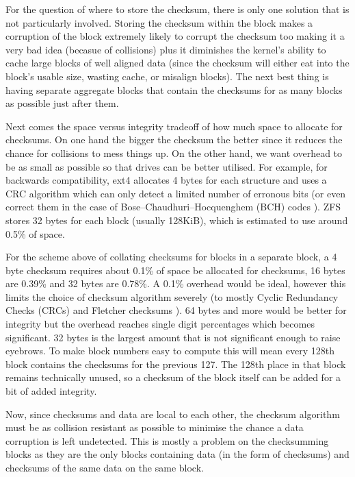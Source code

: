         For the question of where to store the checksum, there is only one
        solution that is not particularly involved. Storing the checksum within
        the block makes a corruption of the block extremely likely to corrupt
        the checksum too making it a very bad idea (becasue of collisions) plus
        it diminishes the kernel's ability to cache large blocks of well
        aligned data (since the checksum will either eat into the block's
        usable size, wasting cache, or misalign blocks). The next best thing is
        having separate aggregate blocks that contain the checksums for as many
        blocks as possible just after them.

        Next comes the space versus integrity tradeoff of how much space to
        allocate for checksums. On one hand the bigger the checksum the better
        since it reduces the chance for collisions to mess things up. On the
        other hand, we want overhead to be as small as possible so that drives
        can be better utilised. For example, for backwards compatibility, ext4
        allocates 4 bytes for each structure \cite{ext4_docs} and uses a CRC
        algorithm which can only detect a limited number of erronous bits (or
        even correct them in the case of Bose–Chaudhuri–Hocquenghem (BCH) codes
        \cite{flash_error_manual}). ZFS stores 32 bytes \cite{ZFS_docs} for
        each block (usually 128KiB), which is estimated to use around 0.5\%
        \cite{ZFS_overhead} of space.

        For the scheme above of collating checksums for blocks in a separate
        block, a 4 byte checksum requires about 0.1\% of space be allocated for
        checksums, 16 bytes are 0.39\% and 32 bytes are 0.78\%. A 0.1\%
        overhead would be ideal, however this limits the choice of checksum
        algorithm severely (to mostly Cyclic Redundancy Checks (CRCs) and
        Fletcher checksums \cite{embedded_checksums}). 64 bytes and more would
        be better for integrity but the overhead reaches single digit
        percentages which becomes significant. 32 bytes is the largest amount
        that is not significant enough to raise eyebrows. To make block numbers
        easy to compute this will mean every 128th block contains the checksums
        for the previous 127. The 128th place in that block remains technically
        unused, so a checksum of the block itself can be added for a bit of
        added integrity.

        Now, since checksums and data are local to each other, the checksum
        algorithm must be as collision resistant as possible to minimise the
        chance a data corruption is left undetected. This is mostly a problem
        on the checksumming blocks as they are the only blocks containing data
        (in the form of checksums) and checksums of the same data on the same
        block.

